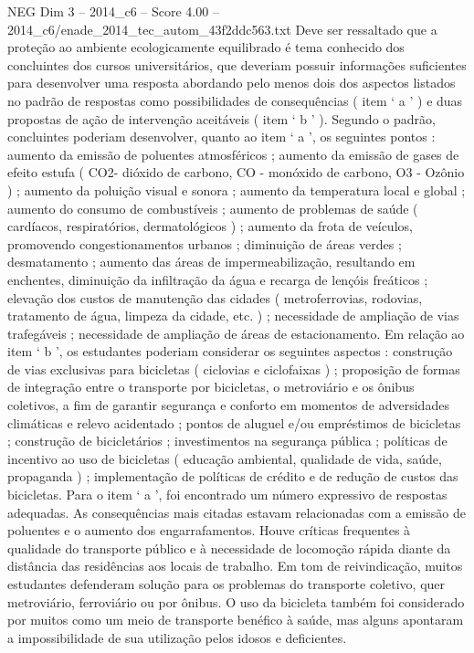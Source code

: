\begin{textsample}{NEG Dim 3 – 2014\_c6 – Score 4.00 – 2014\_c6/enade\_2014\_tec\_autom\_43f2ddc563.txt}
Deve ser ressaltado que a proteção ao ambiente ecologicamente equilibrado é tema conhecido dos concluintes dos cursos universitários, que deveriam possuir informações suficientes para desenvolver uma resposta abordando pelo menos dois dos aspectos listados no padrão de respostas como possibilidades de consequências ( item ‘ a ’ ) e duas propostas de ação de intervenção aceitáveis ( item ‘ b ’ ).
Segundo o padrão, concluintes poderiam desenvolver, quanto ao item ‘ a ’, os seguintes pontos : aumento da emissão de poluentes atmosféricos ; aumento da emissão de gases de efeito estufa ( CO2- dióxido de carbono, CO - monóxido de carbono, O3 - Ozônio ) ; aumento da poluição visual e sonora ; aumento da temperatura local e global ; aumento do consumo de combustíveis ; aumento de problemas de saúde ( cardíacos, respiratórios, dermatológicos ) ; aumento da frota de veículos, promovendo congestionamentos urbanos ; diminuição de áreas verdes ; desmatamento ; aumento das áreas de impermeabilização, resultando em enchentes, diminuição da infiltração da água e recarga de lençóis freáticos ; elevação dos custos de manutenção das cidades ( metroferrovias, rodovias, tratamento de água, limpeza da cidade, etc. ) ; necessidade de ampliação de vias trafegáveis ; necessidade de ampliação de áreas de estacionamento.
Em relação ao item ‘ b ’, os estudantes poderiam considerar os seguintes aspectos : construção de vias exclusivas para bicicletas ( ciclovias e ciclofaixas ) ; proposição de formas de integração entre o transporte por bicicletas, o metroviário e os ônibus coletivos, a fim de garantir segurança e conforto em momentos de adversidades climáticas e relevo acidentado ; pontos de aluguel e/ou empréstimos de bicicletas ; construção de bicicletários ; investimentos na segurança pública ; políticas de incentivo ao uso de bicicletas ( educação ambiental, qualidade de vida, saúde, propaganda ) ; implementação de políticas de crédito e de redução de custos das bicicletas.
Para o item ‘ a ’, foi encontrado um número expressivo de respostas adequadas.
As consequências mais citadas estavam relacionadas com a emissão de poluentes e o aumento dos engarrafamentos.
Houve críticas frequentes à qualidade do transporte público e à necessidade de locomoção rápida diante da distância das residências aos locais de trabalho.
Em tom de reivindicação, muitos estudantes defenderam solução para os problemas do transporte coletivo, quer metroviário, ferroviário ou por ônibus.
O uso da bicicleta também foi considerado por muitos como um meio de transporte benéfico à saúde, mas alguns apontaram a impossibilidade de sua utilização pelos idosos e deficientes.

\end{textsample}

